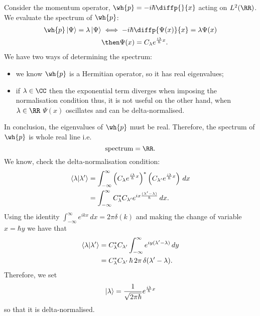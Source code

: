\documentclass[12pt, a4paper]{article}
\begin{document}
\begin{mdexample}
    Consider the momentum operator, \(\wh{p} = -i \hbar \diffp{}{x}\) acting on \(L^2(\RR)\). We evaluate the spectrum of \(\wh{p}\):
    \[\begin{aligned}
        \wh{p} \ket{\Psi} = \lambda \ket{\Psi} &\iff -i\hbar \diffp{\Psi(x)}{x} = \lambda \Psi(x) \\
        &\then \Psi(x) = C_{\lambda} e^{\frac{i\lambda}{\hbar}x}.
    \end{aligned}\]
    We have two ways of determining the spectrum: 
    \begin{itemize}
        \item we know \(\wh{p}\) is a Hermitian operator, so it has real eigenvalues;
        \item if \(\lambda \in \CC\) then the exponential term diverges when imposing the normalisation condition thus, it is not useful on the other hand, when \(\lambda \in \RR\) \(\Psi(x)\) oscillates and can be delta-normalised.
    \end{itemize}
    In conclusion, the eigenvalues of \(\wh{p}\) must be real. Therefore, the spectrum of \(\wh{p}\) is whole real line i.e.
    \[\text{spectrum} = \RR.\]
    We know, check the delta-normalisation condition:
    \[\begin{aligned}
        \bra{\lambda} \ket{\lambda'} &= \int_{-\infty}^{\infty} \left( C_{\lambda} e^{\frac{i\lambda}{\hbar}x} \right)^* \left( C_{\lambda'} e^{\frac{i\lambda}{\hbar}x} \right) \, dx \\
        &= \int_{-\infty}^{\infty} C_{\lambda}^* C_{\lambda'} e^{ix\frac{(\lambda'-\lambda)}{\hbar}} \, dx.
    \end{aligned}\]
    Using the identity \(\int_{-\infty}^{\infty} e^{ikx} \, dx =2\pi \delta(k)\) and making the change of variable \(x=\hbar y\) we have that 
    \[\begin{aligned}
        \bra{\lambda} \ket{\lambda'} &= C_{\lambda}^* C_{\lambda'} \int_{-\infty}^{\infty} e^{iy(\lambda'-\lambda)} \, dy \\
        &= C_{\lambda}^* C_{\lambda'} \, \hbar \, 2\pi \, \delta(\lambda'-\lambda).
    \end{aligned}\]
    Therefore, we set 
    \[\ket{\lambda} = \frac{1}{\sqrt{2\pi \hbar}} e^{\frac{i\lambda}{\hbar}x}\]
    so that it is delta-normalised.
\end{mdexample}
\end{document}
